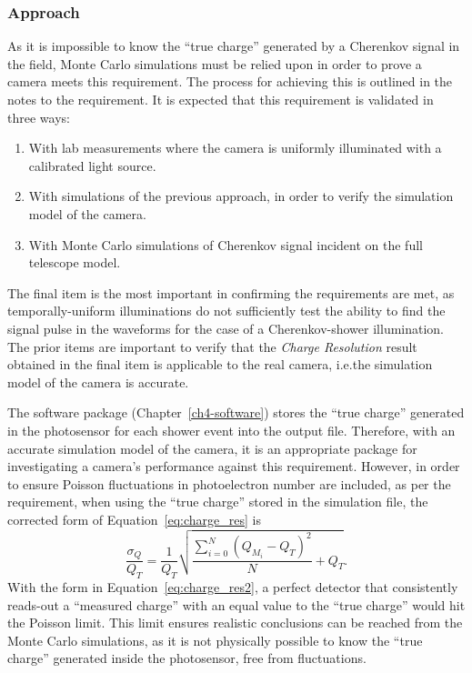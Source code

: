 \subsubsection{Approach}
As it is impossible to know the ``true charge'' generated by a Cherenkov signal in the field, Monte Carlo simulations must be relied upon in order to prove a camera meets this requirement. The process for achieving this is outlined in the notes to the requirement. It is expected that this requirement is validated in three ways:
\begin{enumerate}
\item With lab measurements where the camera is uniformly illuminated with a calibrated light source.
\item With simulations of the previous approach, in order to verify the simulation model of the camera.
\item With Monte Carlo simulations of Cherenkov signal incident on the full telescope model.
\end{enumerate}
The final item is the most important in confirming the requirements are met, as temporally-uniform illuminations do not sufficiently test the ability to find the signal pulse in the waveforms for the case of a Cherenkov-shower illumination. The prior items are important to verify that the \textit{Charge Resolution} result obtained in the final item is applicable to the real camera, i.e.\@ the simulation model of the camera is accurate.

The software package  (Chapter~\ref{ch4-software}) stores the ``true charge'' generated in the photosensor for each shower event into the output file. Therefore, with an accurate simulation model of the camera, it is an appropriate package for investigating a camera's performance against this requirement. However, in order to ensure Poisson fluctuations in photoelectron number are included, as per the requirement, when using the ``true charge'' stored in the simulation file, the corrected form of Equation~\ref{eq:charge_res} is
\begin{equation} \label{eq:charge_res2}
\frac{\sigma_Q}{Q_T} = \frac{1}{Q_T} \sqrt{\frac{\sum_{i=0}^N (Q_{M_i} - Q_T)^2}{N} + Q_T}.
\end{equation}
With the form in Equation~\ref{eq:charge_res2}, a perfect detector that consistently reads-out a ``measured charge'' with an equal value to the ``true charge'' would hit the Poisson limit. This limit ensures realistic conclusions can be reached from the Monte Carlo simulations, as it is not physically possible to know the ``true charge'' generated inside the photosensor, free from fluctuations.

